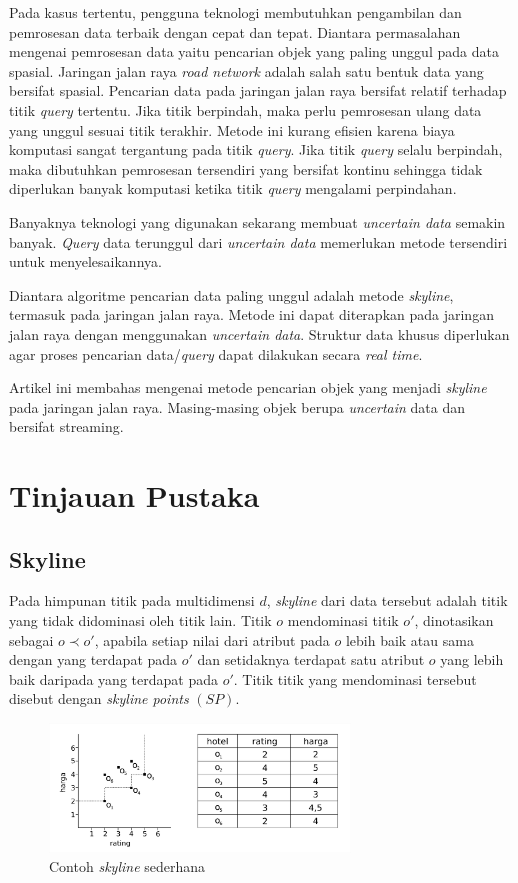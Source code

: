 \documentclass[conference]{IEEEtran}
\begin{document}
Pada kasus tertentu, pengguna teknologi membutuhkan pengambilan dan pemrosesan data terbaik dengan cepat dan tepat. Diantara permasalahan mengenai pemrosesan data yaitu pencarian objek yang paling unggul pada data spasial. Jaringan jalan raya \textit{road network} adalah salah satu bentuk data yang bersifat spasial. Pencarian data pada jaringan jalan raya bersifat relatif terhadap titik \textit{query} tertentu. Jika titik berpindah, maka perlu pemrosesan ulang data yang unggul sesuai titik terakhir. Metode ini kurang efisien karena biaya komputasi sangat tergantung pada titik \textit{query}. Jika titik \textit{query} selalu berpindah, maka dibutuhkan pemrosesan tersendiri yang bersifat kontinu sehingga tidak diperlukan banyak komputasi ketika titik \textit{query} mengalami perpindahan.

Banyaknya teknologi yang digunakan sekarang membuat \textit{uncertain data} semakin banyak. \textit{Query} data terunggul dari \textit{uncertain data} memerlukan metode tersendiri untuk menyelesaikannya.
	
Diantara algoritme pencarian data paling unggul adalah metode \textit{skyline}, termasuk pada jaringan jalan raya. Metode ini dapat diterapkan pada jaringan jalan raya dengan menggunakan \textit{uncertain data}. Struktur data khusus diperlukan agar proses pencarian data/\textit{query} dapat dilakukan secara \textit{real time}.

Artikel ini membahas mengenai metode pencarian objek yang menjadi \textit{skyline} pada jaringan jalan raya. Masing-masing objek berupa \textit{uncertain} data dan bersifat streaming.

\section{Tinjauan Pustaka}
\subsection{Skyline}
Pada himpunan titik pada multidimensi $ d $, \textit{skyline} dari data tersebut adalah titik yang tidak didominasi oleh titik lain. Titik $ o $ mendominasi titik $ o' $, dinotasikan sebagai $ o \prec o' $, apabila setiap nilai dari atribut pada $ o $ lebih baik atau sama dengan yang terdapat pada $ o' $ dan setidaknya terdapat satu atribut $ o $ yang lebih baik daripada yang terdapat pada $ o' $. Titik titik yang mendominasi tersebut disebut dengan \textit{skyline points} $ (SP) $.

\begin{figure}[!htb]
	\centering
	\includegraphics[width=8cm]{imgs/skyline.png}
	\caption{Contoh \textit{skyline} sederhana}
	\label{fig:skyline-traditional}
\end{figure}
\end{document}
